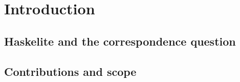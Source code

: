 \chapter{Introduction}
\label{chap:introduction}

\section{Haskelite and the correspondence question}

\section{Contributions and scope}
